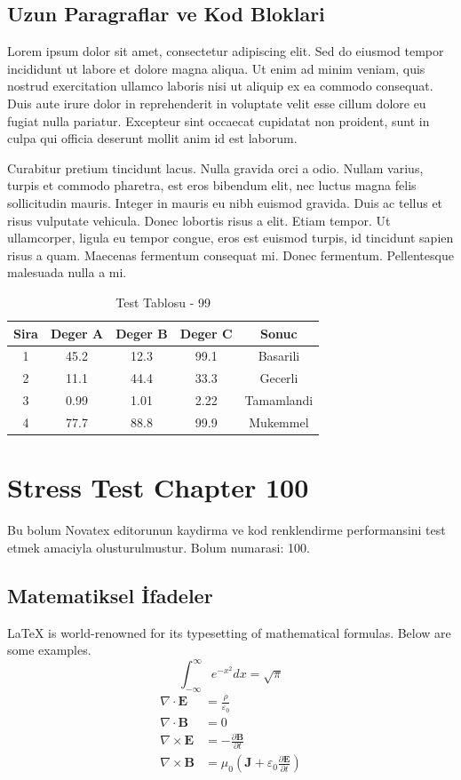 \documentclass[12pt,a4paper]{article}
\begin{document}
\subsection{Uzun Paragraflar ve Kod Bloklari}
Lorem ipsum dolor sit amet, consectetur adipiscing elit. Sed do eiusmod tempor incididunt ut labore et dolore magna aliqua. Ut enim ad minim veniam, quis nostrud exercitation ullamco laboris nisi ut aliquip ex ea commodo consequat. Duis aute irure dolor in reprehenderit in voluptate velit esse cillum dolore eu fugiat nulla pariatur. Excepteur sint occaecat cupidatat non proident, sunt in culpa qui officia deserunt mollit anim id est laborum.

Curabitur pretium tincidunt lacus. Nulla gravida orci a odio. Nullam varius, turpis et commodo pharetra, est eros bibendum elit, nec luctus magna felis sollicitudin mauris. Integer in mauris eu nibh euismod gravida. Duis ac tellus et risus vulputate vehicula. Donec lobortis risus a elit. Etiam tempor. Ut ullamcorper, ligula eu tempor congue, eros est euismod turpis, id tincidunt sapien risus a quam. Maecenas fermentum consequat mi. Donec fermentum. Pellentesque malesuada nulla a mi.

\begin{table}[h!]
\centering
\begin{tabular}{|c|c|c|c|c|}
\hline
\textbf{Sira} & \textbf{Deger A} & \textbf{Deger B} & \textbf{Deger C} & \textbf{Sonuc} \\
\hline
1 & 45.2 & 12.3 & 99.1 & Basarili \\
2 & 11.1 & 44.4 & 33.3 & Gecerli \\
3 & 0.99 & 1.01 & 2.22 & Tamamlandi \\
4 & 77.7 & 88.8 & 99.9 & Mukemmel \\
\hline
\end{tabular}
\caption{Test Tablosu - 99}
\end{table}

\newpage
\section{Stress Test Chapter 100}
Bu bolum Novatex editorunun kaydirma ve kod renklendirme performansini test etmek amaciyla olusturulmustur. Bolum numarasi: 100.

\subsection{Matematiksel İfadeler}
\LaTeX{} is world-renowned for its typesetting of mathematical formulas. Below are some examples.
\begin{equation}
\int_{-\infty}^{\infty} e^{-x^2} dx = \sqrt{\pi}
\end{equation}
\begin{align}
\nabla \cdot \mathbf{E} &= \frac{\rho}{\varepsilon_0} \\
\nabla \cdot \mathbf{B} &= 0 \\
\nabla \times \mathbf{E} &= -\frac{\partial \mathbf{B}}{\partial t} \\
\nabla \times \mathbf{B} &= \mu_0\left(\mathbf{J} + \varepsilon_0 \frac{\partial \mathbf{E}}{\partial t}\right)
\end{align}
\end{document}
